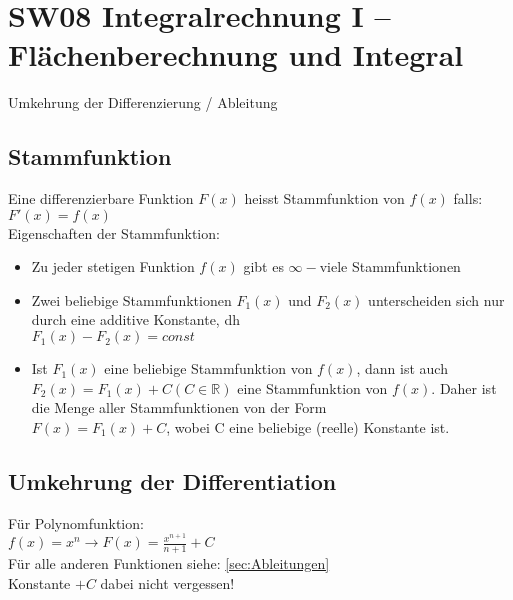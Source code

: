 \documentclass[../main.tex]{subfiles}
\begin{document}

\chapter{SW08 Integralrechnung I -- Flächenberechnung und Integral}
Umkehrung der Differenzierung / Ableitung

\section{Stammfunktion}
Eine differenzierbare Funktion $F(x)$ heisst Stammfunktion von $f(x)$ falls: \\
$F'(x) = f(x)$ \\ [7pt]
Eigenschaften der Stammfunktion:
\begin{itemize}
    \item Zu jeder stetigen Funktion $f(x)$ gibt es $\infty-$viele Stammfunktionen
    \item Zwei beliebige Stammfunktionen $F_1(x)$ und $F_2(x)$ unterscheiden sich nur durch eine additive Konstante, dh \\
    $F_1(x) - F_2(x) = const$
    \item Ist $F_1(x)$ eine beliebige Stammfunktion von $f(x)$, dann ist auch $F_2(x) = F_1(x) + C (C \in \mathbb{R})$ 
    eine Stammfunktion von $f(x)$. Daher ist die Menge aller Stammfunktionen von der Form \\
    $F(x) = F_1(x) + C$, wobei C eine beliebige (reelle) Konstante ist.
\end{itemize}

\section{Umkehrung der Differentiation}
Für Polynomfunktion: \\
$f(x)=x^n \to  F(x)=\frac{x^{n+1}}{n+1}+C$ \\ [7pt]
Für alle anderen Funktionen siehe: \hyperref[sec:Ableitungen]{\ref{sec:Ableitungen} } \\
Konstante $+ C$ dabei nicht vergessen!
\end{document}
